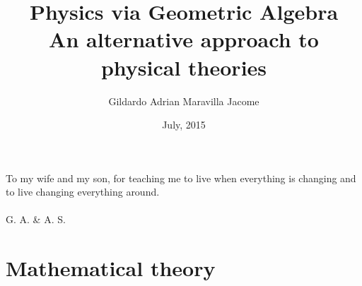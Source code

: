 \documentclass[11pt]{book}
\title{ \textbf{Physics via Geometric Algebra} \\ An alternative approach to physical theories}
\author{Gildardo Adrian Maravilla Jacome}
\date{July, 2015}
\newenvironment{dedication}
{
   \cleardoublepage
   \thispagestyle{empty}
   \vspace*{\stretch{.5}}
   \hfill\begin{minipage}[t]{0.40\textwidth}
   \raggedright
}
{
   \end{minipage}
   \vspace*{\stretch{3}}
   \clearpage
}
\begin{document}
\frontmatter
\maketitle
\begin{dedication}
To my wife and my son, for teaching me to live when everything is changing and to live changing everything around. \\ $$$$ \\ G. A. \& A. S.
\end{dedication}
 
\tableofcontents
\mainmatter
\part{Mathematical theory}
 

\backmatter 
\end{document}
